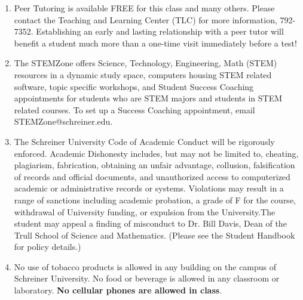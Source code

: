 \documentclass[11pt, a4paper]{article}
\begin{document}
\begin{enumerate}
\item Peer Tutoring is available FREE for this class and many others.  Please contact the Teaching and Learning Center (TLC) for more information, 792-7352.  Establishing an early and lasting relationship with a peer tutor will benefit a student much more than a one-time visit immediately before a test!

\item The STEMZone offers Science, Technology, Engineering, Math (STEM) resources in a dynamic study space, computers housing STEM related software, topic specific workshops, and Student Success Coaching appointments for students who are STEM majors and students in STEM related courses. To set up a Success Coaching appointment, email STEMZone@schreiner.edu.

\item The Schreiner University Code of Academic Conduct will be rigorously enforced. Academic Dishonesty includes, but may not be limited to, cheating, plagiarism, fabrication, obtaining an unfair advantage, collusion, falsification of records and official documents, and unauthorized access to computerized academic or administrative records or systems. Violations may result in a range of sanctions including academic probation, a grade of F for the course, withdrawal of University funding, or expulsion from the University.The student may appeal a finding of misconduct to Dr. Bill Davis, Dean of the Trull School of Science and Mathematics. (Please see the Student Handbook for policy details.)

\item No use of tobacco products is allowed in any building on the campus of Schreiner University.  No food or beverage is allowed in any classroom or laboratory. \textbf{No cellular phones are allowed in class}.
\end{enumerate}


\newpage
\end{document}

